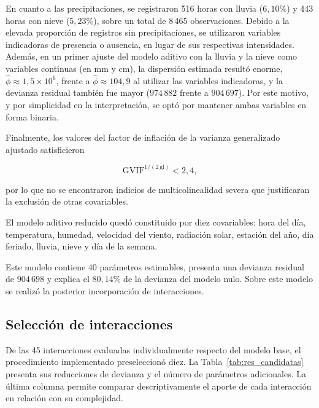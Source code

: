 \documentclass[12pt, a4paper]{article}
\numberwithin{equation}{section}
\begin{document}
En cuanto a las precipitaciones, se registraron
516 horas con lluvia ($6{,}10\%$) y 443 horas con
nieve ($5{,}23\%$), sobre un total de 8\,465
observaciones. Debido a la elevada proporción de
registros sin precipitaciones, se utilizaron
variables indicadoras de presencia o ausencia,
en lugar de sus respectivas intensidades.
Además, en un primer ajuste del modelo aditivo
con la lluvia y la nieve como variables continuas
(en mm y cm), la dispersión estimada resultó
enorme, $\widehat\phi\approx1{,}5\times10^{6}$,
frente a $\widehat\phi\approx104{,}9$ al
utilizar las variables indicadoras, y la devianza
residual también fue mayor ($974\,882$ frente a
$904\,697$). Por este motivo, y por simplicidad
en la interpretación, se optó por mantener ambas
variables en forma binaria.
\newpage

Finalmente, los valores del factor de inflación
de la varianza generalizado ajustado \cite{fox} satisficieron

\[
\mathrm{GVIF}^{1/(2\,\mathrm{gl})}<2{,}4,
\]

por lo que no se encontraron indicios de
multicolinealidad severa que justificaran la
exclusión de otras covariables.

El modelo aditivo reducido quedó constituido por
diez covariables: hora del día, temperatura,
humedad, velocidad del viento, radiación solar,
estación del año, día feriado, lluvia, nieve
y día de la semana.

Este modelo contiene 40 parámetros estimables,
presenta una devianza residual de $904\,698$
y explica el $80{,}14\%$ de la devianza del modelo
nulo.
Sobre este modelo se realizó la posterior
incorporación de interacciones.
\subsection{Selección de interacciones}

De las 45 interacciones evaluadas individualmente respecto del modelo base, el procedimiento implementado preseleccionó diez. La Tabla~\ref{tab:res_candidatas} presenta sus reducciones de devianza y el número de parámetros adicionales. La última columna permite comparar descriptivamente el aporte de cada interacción en relación con su complejidad.
\end{document}
